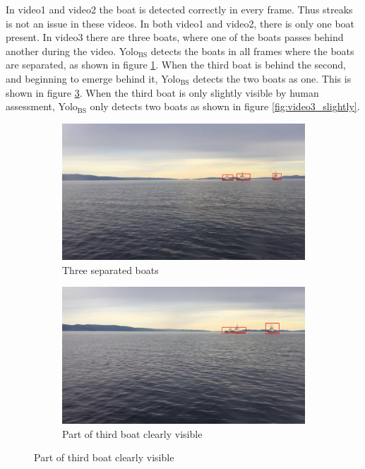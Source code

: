 \newpage

In video1 and video2 the boat is detected correctly in every frame. Thus streaks is not an issue in these videos. In both video1 and video2, there is only one boat present. In video3 there are three boats, where one of the boats passes behind another during the video. Yolo$_{\text{BS}}$ detects the boats in all frames where the boats are separated, as shown in figure \ref{fig:video3_sep}. When the third boat is behind the second, and beginning to emerge behind it, Yolo$_{\text{BS}}$ detects the two boats as one. This is shown in figure \ref{fig:video3_bigboat}. When the third boat is only slightly visible by human assessment, Yolo$_{\text{BS}}$ only detects two boats as shown in figure \ref{fig:video3_slightly}. 

\begin{figure}[h!]
\centering
\begin{subfigure}[b]{0.78\textwidth}
   \includegraphics[width=1\linewidth]{results/video/video3/frame677.jpg}
   \caption{Three separated boats}
   \label{fig:video3_sep} 
\end{subfigure}

\begin{subfigure}[b]{0.78\textwidth}
   \includegraphics[width=1\linewidth]{results/video/video3/frame479.jpg}
   \caption{Part of third boat clearly visible}
   \label{fig:video3_bigboat}
\end{subfigure}


\end{figure}
